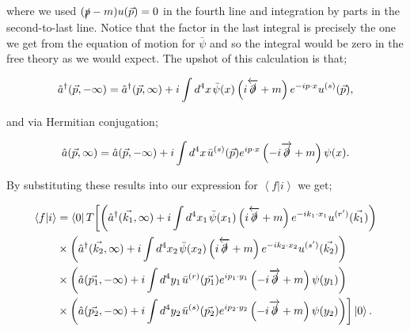 where we used $(\slashed{p} - m)u(\vec{p}) = 0$ in the fourth line and integration by parts in the second-to-last line. Notice that the factor in the last integral is precisely the one we get from the equation of motion for $\bar{\psi}$ and so the integral would be zero in the free theory as we would expect. The upshot of this calculation is that;

\begin{equation}
\hat{a}^\dagger(\vec{p},-\infty) = \hat{a}^\dagger(\vec{p},\infty) + i \int d^4 x \hspace{1pt} \bar{\psi}(x) \left(i \overleftarrow{\slashed{\partial}} + m \right) e^{- i p \cdot x} u^{(s)}(\vec{p}),
\end{equation}

and via Hermitian conjugation;

\begin{equation}
\hat{a}(\vec{p},\infty) = \hat{a}(\vec{p},-\infty) + i \int d^4 x \hspace{1pt} \bar{u}^{(s)}(\vec{p}) e^{i p \cdot x} \left(-i \overrightarrow{\slashed{\partial}} + m \right)  \psi(x).
\end{equation} %

By substituting these results into our expression for $\left<f | i \right>$ we get;

\begin{equation}
\begin{split}
\left<f | i \right> & =  \left < 0 \right | T \biggl[ \left (\hat{a}^\dagger(\vec{k_1},\infty) + i \int d^4 x_1 \hspace{1pt} \bar{\psi}(x_1) \left(i \overleftarrow{\slashed{\partial}} + m \right) e^{- i k_1 \cdot x_1} u^{(r')}(\vec{k_1}) 
 \right ) \\
  & \times  \left (\hat{a}^\dagger(\vec{k_2},\infty) + i \int d^4 x_2 \hspace{1pt} \bar{\psi}(x_2) \left(i \overleftarrow{\slashed{\partial}} + m \right) e^{- i k_2 \cdot x_2} u^{(s')}(\vec{k_2}) 
 \right ) \\
  & \times  \left (\hat{a}(\vec{p_1},-\infty) + i \int d^4 y_1 \hspace{1pt} \bar{u}^{(r)}(\vec{p_1}) e^{i p_1 \cdot y_1} \left(-i \overrightarrow{\slashed{\partial}} + m \right)  \psi(y_1)
 \right ) \\
  & \times   \left (\hat{a}(\vec{p_2},-\infty) + i \int d^4 y_2 \hspace{1pt} \bar{u}^{(s)}(\vec{p_2}) e^{i p_2 \cdot y_2} \left(-i \overrightarrow{\slashed{\partial}} + m \right)  \psi(y_2)
 \right ) \biggr ] \left| 0 \right>.
\end{split}
\end{equation}

